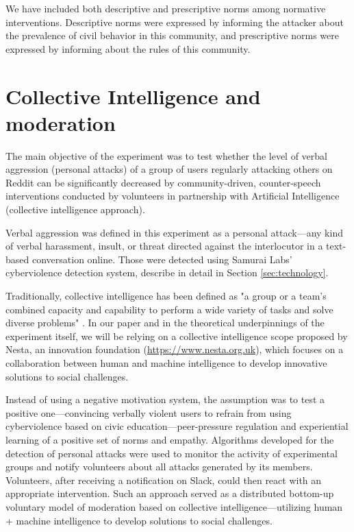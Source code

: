 \documentclass[preprint,12pt]{elsarticle}
\begin{document}
We have included both descriptive and prescriptive norms among normative interventions. Descriptive norms were expressed by informing the attacker about the prevalence of civil behavior in this community, and prescriptive norms were expressed by informing about the rules of  this community. 

	





\section{Collective Intelligence and  moderation}\label{sec:collective-intelligence}

The main objective of the experiment was to test whether the level of verbal aggression (personal attacks) of a group of users regularly attacking others on Reddit can be significantly decreased by community-driven, counter-speech interventions conducted by volunteers in partnership with Artificial Intelligence (collective intelligence approach).

Verbal aggression was defined in this experiment as a personal attack---any kind of verbal harassment, insult, or threat directed against the interlocutor in a text-based conversation online. Those were detected using Samurai Labs' cyberviolence detection system, describe in detail in Section \ref{sec:technology}.

Traditionally, collective intelligence has been defined as "a group or a team's combined capacity and capability to perform a wide variety of tasks and solve diverse problems" \citep{woolley2015collective}. In our paper and in the theoretical underpinnings of the experiment itself, we will be relying on a collective intelligence scope proposed by Nesta, an innovation foundation (\url{https://www.nesta.org.uk}), which focuses on a collaboration between human and machine intelligence to develop innovative solutions to social challenges.


Instead of using a negative motivation system, the assumption was to test a positive one—convincing verbally violent users to refrain from using cyberviolence based on civic education—peer-pressure regulation and experiential learning of a positive set of norms and empathy. Algorithms developed for the detection of personal attacks were used to monitor the activity of experimental groups and notify volunteers about all attacks generated by its members. Volunteers, after receiving a notification on Slack, could then react with an appropriate intervention. Such an approach served as a distributed bottom-up voluntary model of moderation based on collective intelligence—utilizing human + machine intelligence to develop solutions to social challenges.
\end{document}
